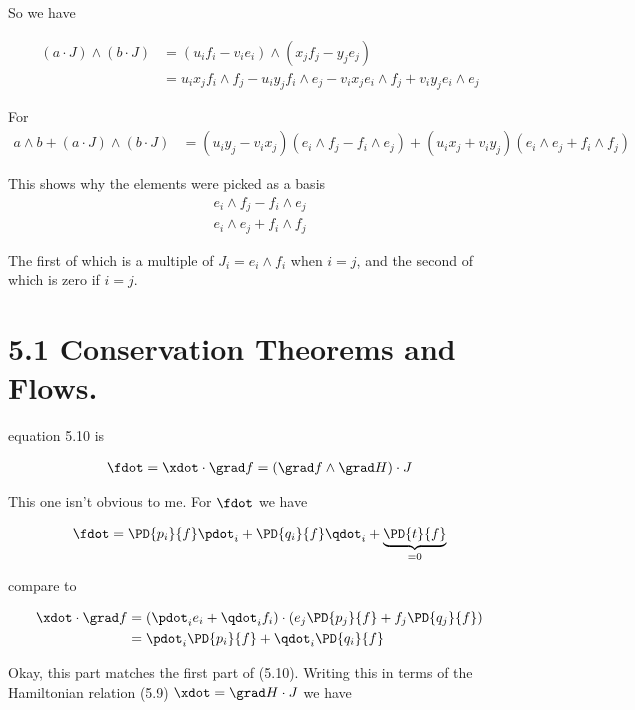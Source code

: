 So we have

\begin{align*}
(a \cdot J) \wedge (b \cdot J) 
&= (u_i f_i - v_i e_i) \wedge (x_j f_j - y_j e_j) \\
&=
 u_i x_j f_i \wedge f_j 
-u_i y_j f_i \wedge e_j
- v_i x_j e_i \wedge f_j
+ v_i y_j e_i \wedge e_j
\end{align*}

For
\begin{align*}
a \wedge b + (a \cdot J) \wedge (b \cdot J) 
&= 
 ( u_i y_j - v_i x_j ) (e_i \wedge f_j - f_i \wedge e_j)
+ ( u_i x_j + v_i y_j ) (e_i \wedge e_j + f_i \wedge f_j)
\end{align*}

This shows why the elements were picked as a basis
\begin{align*}
e_i \wedge f_j - f_i \wedge e_j
\end{align*}
\begin{align*}
e_i \wedge e_j + f_i \wedge f_j
\end{align*}

The first of which is a multiple of $J_i = e_i \wedge f_i$ when $i=j$, and the second of which is zero if $i=j$.

\section{5.1 Conservation Theorems and Flows. } 

equation 5.10 is

\begin{align*}
\fdot = \xdot \cdot \grad f = (\grad f \wedge \grad H) \cdot J
\end{align*}

This one isn't obvious to me.  For $\fdot$ we have

\begin{align*}
\fdot = \PD{p_i}{f} \pdot_i +\PD{q_i}{f} \qdot_i + \underbrace{\PD{t}{f}}_{=0}
\end{align*}

compare to 

\begin{align*}
\xdot \cdot \grad f 
&= (\pdot_i e_i + \qdot_i f_i) \cdot (e_j \PD{p_j}{f} + f_j \PD{q_j}{f}) \\
&= \pdot_i \PD{p_i}{f} + \qdot_i \PD{q_i}{f}
\end{align*}

Okay, this part matches the first part of (5.10).  Writing this in terms of the Hamiltonian relation (5.9) $\xdot = \grad H \cdot J$ we have

